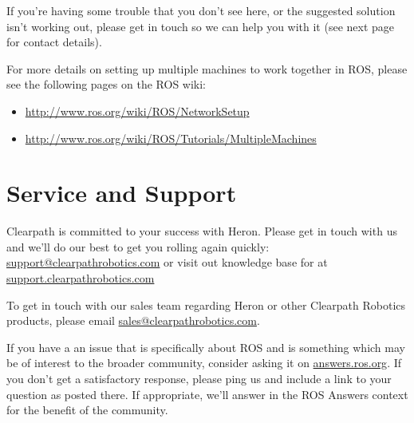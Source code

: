 \documentclass[]{clearpath-latex/clearpath-manual}
\begin{document}
If you’re having some trouble that you don’t see here, or the suggested solution isn’t working out, please get in touch so we can help you with it (see next page for contact details).

For more details on setting up multiple machines to work together in ROS, please see the following pages on the ROS wiki:

\begin{itemize}[nolistsep]


	\item \url{http://www.ros.org/wiki/ROS/NetworkSetup}
	\item \url{http://www.ros.org/wiki/ROS/Tutorials/MultipleMachines}
\end{itemize}

\newpage

\section{Service and Support}
Clearpath is committed to your success with Heron. Please get in touch with us and we'll
do our best to get you rolling again quickly: \href{mailto:support@clearpathrobotics.com}{support@clearpathrobotics.com}
or visit out knowledge base for at \href{http://support.clearpathrobotics.com}{support.clearpathrobotics.com}

To get in touch with our sales team regarding Heron or other Clearpath Robotics products, please
email \href{mailto:sales@clearpathrobotics.com}{sales@clearpathrobotics.com}.

If you have a an issue that is specifically about ROS and is something which may be of interest
to the broader community, consider asking it on \href{http://answers.ros.org}{answers.ros.org}.
If you don't get a satisfactory response, please ping us and include a link to your question
as posted there. If appropriate, we'll answer in the ROS Answers context for the benefit of the
community.
\end{document}
